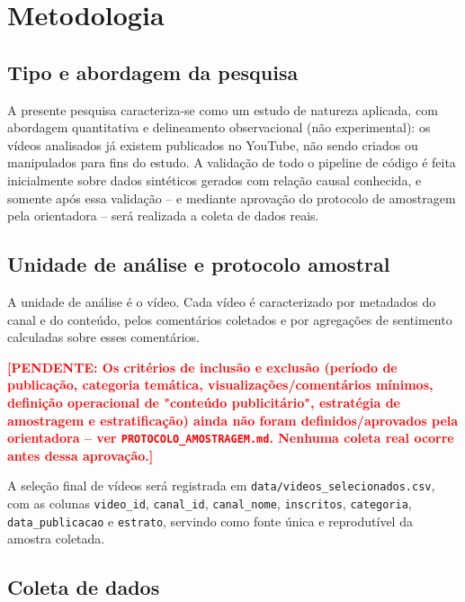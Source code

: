 \documentclass[12pt,a4paper]{article}
\newcommand{\pendente}[1]{\textcolor{red}{\textbf{[PENDENTE: #1]}}}
\begin{document}
\section{Metodologia}

\subsection{Tipo e abordagem da pesquisa}

A presente pesquisa caracteriza-se como um estudo de natureza aplicada, com abordagem quantitativa e delineamento observacional (não experimental): os vídeos analisados já existem publicados no YouTube, não sendo criados ou manipulados para fins do estudo. A validação de todo o pipeline de código é feita inicialmente sobre dados sintéticos gerados com relação causal conhecida, e somente após essa validação -- e mediante aprovação do protocolo de amostragem pela orientadora -- será realizada a coleta de dados reais.

\subsection{Unidade de análise e protocolo amostral}

A unidade de análise é o vídeo. Cada vídeo é caracterizado por metadados do canal e do conteúdo, pelos comentários coletados e por agregações de sentimento calculadas sobre esses comentários.

\pendente{Os critérios de inclusão e exclusão (período de publicação, categoria temática, visualizações/comentários mínimos, definição operacional de "conteúdo publicitário", estratégia de amostragem e estratificação) ainda não foram definidos/aprovados pela orientadora -- ver \texttt{PROTOCOLO\_AMOSTRAGEM.md}. Nenhuma coleta real ocorre antes dessa aprovação.}

A seleção final de vídeos será registrada em \texttt{data/videos\_selecionados.csv}, com as colunas \texttt{video\_id}, \texttt{canal\_id}, \texttt{canal\_nome}, \texttt{inscritos}, \texttt{categoria}, \texttt{data\_publicacao} e \texttt{estrato}, servindo como fonte única e reprodutível da amostra coletada.

\subsection{Coleta de dados}
\end{document}
